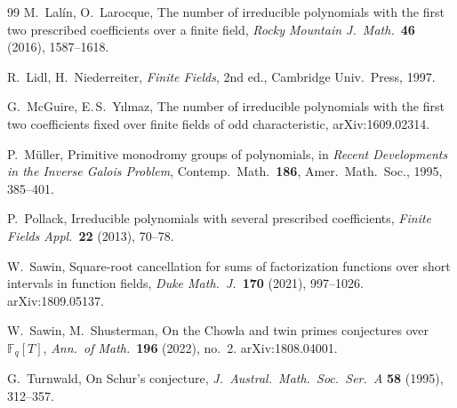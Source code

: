 \documentclass[11pt,a4paper]{article}
\theoremstyle{definition}
\theoremstyle{remark}
\begin{document}
\begin{thebibliography}{99}
M.~Lal\'in, O.~Larocque,
The number of irreducible polynomials with the first two prescribed coefficients over a finite field,
\textit{Rocky Mountain J.\ Math.}\ \textbf{46} (2016), 1587--1618.

R.~Lidl, H.~Niederreiter,
\textit{Finite Fields}, 2nd ed., Cambridge Univ.\ Press, 1997.

G.~McGuire, E.\,S.~Y\i lmaz,
The number of irreducible polynomials with the first two coefficients fixed over finite fields of
odd characteristic, arXiv:1609.02314.

P.~M\"uller,
Primitive monodromy groups of polynomials, in
\textit{Recent Developments in the Inverse Galois Problem}, Contemp.\ Math.\ \textbf{186},
Amer.\ Math.\ Soc., 1995, 385--401.

P.~Pollack,
Irreducible polynomials with several prescribed coefficients,
\textit{Finite Fields Appl.}\ \textbf{22} (2013), 70--78.

W.~Sawin,
Square-root cancellation for sums of factorization functions over short intervals in function fields,
\textit{Duke Math.\ J.}\ \textbf{170} (2021), 997--1026. arXiv:1809.05137.

W.~Sawin, M.~Shusterman,
On the Chowla and twin primes conjectures over $\mathbb F_q[T]$,
\textit{Ann.\ of Math.}\ \textbf{196} (2022), no.~2. arXiv:1808.04001.

G.~Turnwald,
On Schur's conjecture,
\textit{J.\ Austral.\ Math.\ Soc.\ Ser.~A} \textbf{58} (1995), 312--357.

\end{thebibliography}
\end{document}
